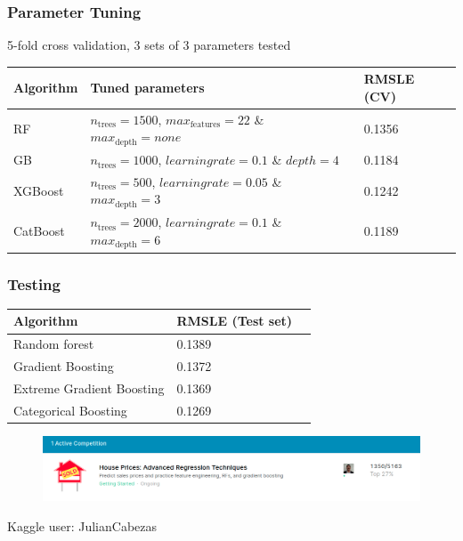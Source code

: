 \documentclass{beamer}
\begin{document}
\begin{frame}
	\frametitle{Parameter Tuning}
	
	5-fold cross validation, 3 sets of 3 parameters tested
	
\begin{table}[H]
	\begin{center}
		\begin{tabular}{|p{1.5cm}|p{7cm}|p{2cm}|}
			\hline
			Algorithm & Tuned parameters & RMSLE (CV) \\
			\hline\hline
			RF & $n_\mathrm{trees} = 1500$, $max_\mathrm{features} = 22$ \&  $max_\mathrm{depth} = none$ & 0.1356\\
			GB & $n_\mathrm{trees} = 1000$, $learning rate = 0.1$ \& $depth = 4$ & 0.1184\\
			XGBoost  & $n_\mathrm{trees} = 500$, $learning rate = 0.05$ \& $max_\mathrm{depth} = 3$ & 0.1242 \\
			CatBoost & $n_\mathrm{trees} = 2000$, $learning rate = 0.1$ \& $max_\mathrm{depth} = 6$ & 0.1189\\
			\hline
		\end{tabular}
	\end{center}
	\label{table:tuningres}
\end{table}
	
\end{frame}

\begin{frame}
	
	\frametitle{Testing}
	
	\begin{table}[H]
		\begin{center}
			\begin{tabular}{|p{4.5cm}|p{3cm}|p{3cm}|}
				\hline
				Algorithm & RMSLE (Test set) \\
				\hline\hline
				Random forest & 0.1389 \\
				Gradient Boosting & 0.1372  \\
				Extreme Gradient Boosting  & 0.1369
				\\
				Categorical Boosting & 0.1269\\
				\hline
			\end{tabular}
		\end{center}
		\label{table:test}
	\end{table}

	\begin{figure}
		\centering
		\includegraphics[width=1.05\linewidth]{screenshot001}
		\label{fig:screenshot001}
	\end{figure}

	Kaggle user: JulianCabezas

\end{frame}
\end{document}
